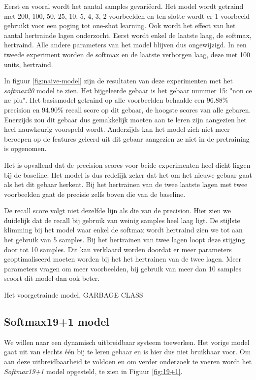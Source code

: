\npar Eerst en vooral wordt het aantal samples gevari\"eerd. Het model wordt getraind met 200, 100, 50, 25, 10, 5, 4, 3, 2 voorbeelden en ten slotte wordt er 1 voorbeeld gebruikt voor een poging tot one-shot learning.
\npar Ook wordt het effect van het aantal hertrainde lagen onderzocht. Eerst wordt enkel de laatste laag, de softmax, hertraind. Alle andere parameters van het model blijven dus ongewijzigd. In een tweede experiment worden de softmax en de laatste verborgen laag, deze met 100 units, hertraind.

\npar In figuur \ref{fig:naive-model} zijn de resultaten van deze experimenten met het \textit{softmax20} model te zien. Het bijgeleerde gebaar is het gebaar nummer 15: "non ce ne piu". Het basismodel getraind op alle voorbeelden behaalde een 96.88\% precision en 94.90\% recall score op dit gebaar, de hoogste scores van alle gebaren. Enerzijds zou dit gebaar dus gemakkelijk moeten aan te leren zijn aangezien het heel nauwkeurig voorspeld wordt. Anderzijds kan het model zich niet meer beroepen op de features geleerd uit dit gebaar aangezien ze niet in de pretraining is opgenomen.

\npar Het is opvallend dat de precision scores voor beide experimenten heel dicht liggen bij de baseline. Het model is dus redelijk zeker dat het om het nieuwe gebaar gaat als het dit gebaar herkent. Bij het hertrainen van de twee laatste lagen met twee voorbeelden gaat de precisie zelfs boven die van de baseline.

\npar De recall score volgt niet dezelfde lijn als die van de precision. Hier zien we duidelijk dat de recall bij gebruik van weinig samples heel laag ligt. De stijlste klimming bij het model waar enkel de softmax wordt hertraind zien we tot aan het gebruik van 5 samples. Bij het hertrainen van twee lagen loopt deze stijging door tot 10 samples. Dit kan verklaard worden doordat er meer parameters geoptimaliseerd moeten worden bij het het hertrainen van de twee lagen. Meer parameters vragen om meer voorbeelden, bij gebruik van meer dan 10 samples scoort dit model dan  ook beter.

\npar Het voorgetrainde model, GARBAGE CLASS


\subsection{Softmax19+1 model}\label{sec:softmax19x1}
We willen naar een dynamisch uitbreidbaar systeem toewerken. Het vorige model gaat uit van slechts \'e\'en bij te leren gebaar en is hier dus niet bruikbaar voor. Om aan deze uitbreidbaarheid te voldoen en om verder onderzoek te voeren wordt het \textit{Softmax19+1} model opgesteld, te zien in Figuur \ref{fig:19+1}.

